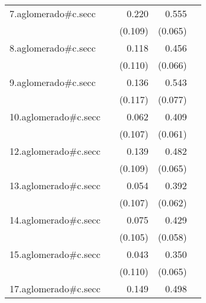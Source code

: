 {\begin{longtable}{l*{4}{D{.}{.}{-1}}}
\addlinespace
7.aglomerado#c.secc&                     &       0.220\sym{*}  &       0.555\sym{***}&                     \\
            &                     &     (0.109)         &     (0.065)         &                     \\
\addlinespace
8.aglomerado#c.secc&                     &       0.118         &       0.456\sym{***}&                     \\
            &                     &     (0.110)         &     (0.066)         &                     \\
\addlinespace
9.aglomerado#c.secc&                     &       0.136         &       0.543\sym{***}&                     \\
            &                     &     (0.117)         &     (0.077)         &                     \\
\addlinespace
10.aglomerado#c.secc&                     &       0.062         &       0.409\sym{***}&                     \\
            &                     &     (0.107)         &     (0.061)         &                     \\
\addlinespace
12.aglomerado#c.secc&                     &       0.139         &       0.482\sym{***}&                     \\
            &                     &     (0.109)         &     (0.065)         &                     \\
\addlinespace
13.aglomerado#c.secc&                     &       0.054         &       0.392\sym{***}&                     \\
            &                     &     (0.107)         &     (0.062)         &                     \\
\addlinespace
14.aglomerado#c.secc&                     &       0.075         &       0.429\sym{***}&                     \\
            &                     &     (0.105)         &     (0.058)         &                     \\
\addlinespace
15.aglomerado#c.secc&                     &       0.043         &       0.350\sym{***}&                     \\
            &                     &     (0.110)         &     (0.065)         &                     \\
\addlinespace
17.aglomerado#c.secc&                     &       0.149         &       0.498\sym{***}&                     \\

\end{longtable}}
